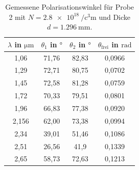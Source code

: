 \begin{table}[H]
    \centering
    \caption{Gemessene Polarisationswinkel für Probe 2 mit $N = \qty{2.8e18}{\per\cubic\centi\meter}$ und Dicke $d = \qty{1.296}{\milli\meter}$.}
    \label{tab:probe2}
    \begin{tabular}{c c c c}
        \toprule
        {$\lambda$ in $\si{\micro\meter}$} & {$\theta_1$ in $\si{\degree}$} & {$\theta_2$ in $\si{\degree}$} & {$\theta_\text{frei}$ in $\si{\radian}$} \\
        \midrule
        1,06 & 71,76 & 82,83 & 0,0966 \\
        1,29 & 72,71 & 80,75 & 0,0702 \\
        1,45 & 72,58 & 81,28 & 0,0759 \\
        1,72 & 70,33 & 79,51 & 0,0801 \\
        1,96 & 66,83 & 77,38 & 0,0920 \\
        2,156& 62,00 & 73,38 & 0,0994 \\
        2,34 & 39,01 & 51,46 & 0,1086 \\ 
        2,51 & 26,56 & 41,9  & 0,1339 \\
        2,65 & 58,73 & 72,63 & 0,1213 \\ 
        \bottomrule
    \end{tabular}
\end{table}

